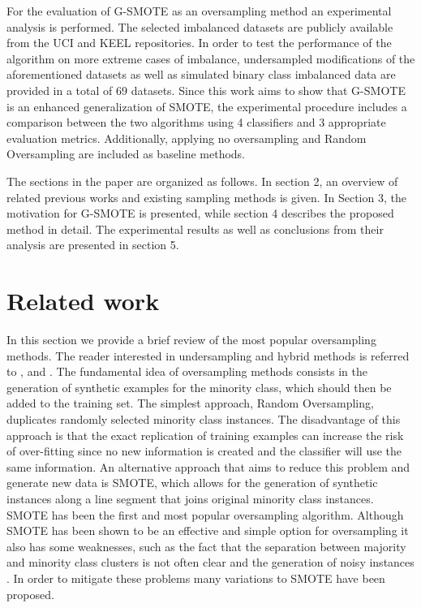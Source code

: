 \documentclass[parskip=full]{scrartcl}
\begin{document}
For the evaluation of G-SMOTE as an oversampling method an experimental analysis
is performed. The selected imbalanced datasets are publicly available from the
UCI \cite{Lichman2013} and KEEL \cite{Alcala-Fdez2011} repositories. In order to
test the performance of the algorithm on more extreme cases of imbalance,
undersampled modifications of the aforementioned datasets as well as simulated
binary class imbalanced data are provided in a total of 69 datasets. Since this
work aims to show that G-SMOTE is an enhanced generalization of SMOTE, the
experimental procedure includes a comparison between the two algorithms using 4
classifiers and 3 appropriate evaluation metrics. Additionally, applying no
oversampling and Random Oversampling are included as baseline methods.

The sections in the paper are organized as follows. In section 2, an overview of
related previous works and existing sampling methods is given. In Section 3, the
motivation for G-SMOTE is presented, while section 4 describes the proposed
method in detail. The experimental results as well as conclusions from their
analysis are presented in section 5.

\section{Related work}

In this section we provide a brief review of the most popular oversampling
methods. The reader interested in undersampling and hybrid methods is referred
to  \cite{Galar2012}, \cite{Chawla2005} and \cite{Fernandez2018}. The
fundamental idea of oversampling methods consists in the generation of synthetic
examples for the minority class, which should then be added to the training set.
The simplest approach, Random Oversampling, duplicates randomly selected
minority class instances. The disadvantage of this approach is that the exact
replication of training examples can increase the risk of over-fitting since no
new information is created and the classifier will use the same information. An
alternative approach that aims to reduce this problem and generate new data is
SMOTE, which allows for the generation of synthetic instances along a line
segment that joins original minority class instances. SMOTE has been the first
and most popular oversampling algorithm. Although SMOTE has been shown to be an
effective and simple option for oversampling it also has some weaknesses, such
as the fact that the separation between majority and minority class clusters is
not often clear and the generation of noisy instances \cite{He2009}. In order to
mitigate these problems many variations to SMOTE have been proposed.
\end{document}
